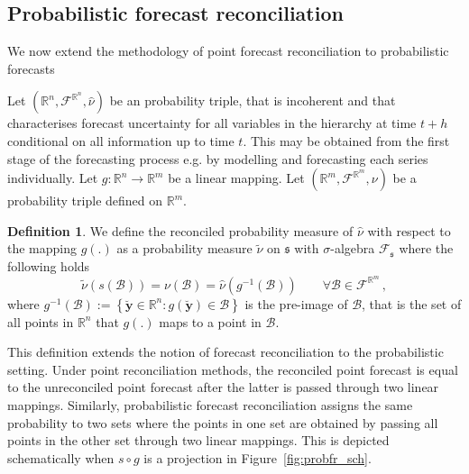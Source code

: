\documentclass[a4paper, 11pt]{article}
\theoremstyle{theo}
\theoremstyle{definition}
\newtheorem{definition}{Definition}[section]
\begin{document}
\subsection{Probabilistic forecast reconciliation}

We now extend the methodology of point forecast reconciliation to probabilistic forecasts


  Let $(\mathbb{R}^n, \mathscr{F}^{\mathbb{R}^n}, \hat{\nu})$ be an probability triple, that is incoherent and that characterises forecast uncertainty for all variables in the hierarchy at time $t+h$ conditional on all information up to time $t$.  This may be obtained from the first stage of the forecasting process e.g. by modelling and forecasting each series individually.  Let $g:\mathbb{R}^n \rightarrow \mathbb{R}^m $ be a linear mapping.  Let $(\mathbb{R}^m, \mathscr{F}^{\mathbb{R}^m}, \nu)$ be a probability triple defined on $\mathbb{R}^m$.
  \begin{definition} \label{def:reconprob}
  We define the reconciled probability measure of $\hat{\nu}$ with respect to the mapping $g(.)$ as a probability measure $\tilde{\nu}$ on $\mathfrak{s}$ with $\sigma$-algebra $\mathscr{F}_\mathfrak{s}$ where the following holds
  \begin{equation}
  \tilde{\nu}(s(\mathcal{B})) = \nu(\mathcal{B})= \hat{\nu}(g^{-1}(\mathcal{B})) \qquad \forall \mathcal{B} \in \mathscr{F}^{\mathbb{R}^m}\,,
  \end{equation}
  where $g^{-1}(\mathcal{B}):=\left\{\breve{\bm{y}}\in \mathbb{R}^n:g(\breve{\bm{y}})\in \mathcal{B} \right\}$ is the pre-image of $\mathcal{B}$, that is the set of all points in $\mathbb{R}^n$ that $g(.)$ maps to a point in $\mathcal{B}$.
\end{definition}



This definition extends the notion of forecast reconciliation to the probabilistic setting.   Under point reconciliation methods, the reconciled point forecast is equal to the unreconciled point forecast after the latter is passed through two linear mappings. Similarly, probabilistic forecast reconciliation assigns the same probability to two sets where the points in one set are obtained by passing all points in the other set through two linear mappings.  This is depicted schematically when $s\circ g$ is a projection in Figure~\ref{fig:probfr_sch}.
\end{document}

